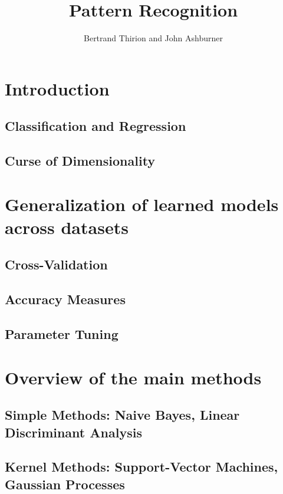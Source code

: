 \documentclass{beamer}
\title{Pattern Recognition}
\author{Bertrand Thirion and John Ashburner}
\date{}
\begin{document}
\begin{frame}
\titlepage
\end{frame}

\section{Introduction}
    \subsection{Classification and Regression}                               
    \subsection{Curse of Dimensionality}                                     
\section{Generalization of learned models across datasets}
    \subsection{Cross-Validation}                                            
    \subsection{Accuracy Measures}                                           
    \subsection{Parameter Tuning}                                            
\section{Overview of the main methods}
    \subsection{Simple Methods: Naive Bayes, Linear Discriminant Analysis}   
    \subsection{Kernel Methods: Support-Vector Machines, Gaussian Processes} 
\end{document}
